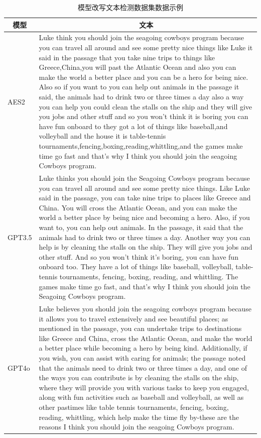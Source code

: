 \begin{table}[htbp]
\centering
\caption{模型改写文本检测数据集数据示例} \label{tab:TOSWT-eg}
\begin{tabular}{lp{12cm}}
\toprule
\multicolumn{1}{c}{\textbf{模型}} & \multicolumn{1}{c}{\textbf{文本}}  \\ \midrule
AES2 \cite{learning-agency-lab-automated-essay-scoring-2}                            & Luke think you should join the   seagoing cowboys program because you can travel all around and see some   pretty nice things like Luke it said in the passage that you take nine trips   to things like Greece,China,you will past the Atlantic Ocean and also you can   make the world a better place and you can be a hero for being nice. Also so if you want to you can help out animals in the passage it said, the   animals had to drink two or three times a day also a way you can help you   could clean the stalls on the ship and they will give you jobs and other   stuff and so you won't think it is boring you can have fun onboard to they   got a lot of things like baseball,and volleyball and the house it is   table-tennis tournaments,fencing,boxing,reading,whittling,and the games make   time go fast and that's why I think you should join the seagoing Cowboys   program. \\ \midrule
GPT3.5 \cite{chatgpt}                         & Luke thinks you should   join the Seagoing Cowboys program because you can travel all around and see   some pretty nice things. Like Luke said in the passage, you can take nine   trips to places like Greece and China. You will cross the Atlantic Ocean, and   you can make the world a better place by being nice and becoming a   hero. Also, if you want to, you can help out animals. In the passage, it said   that the animals had to drink two or three times a day. Another way you can   help is by cleaning the stalls on the ship. They will give you jobs and other   stuff. And so you won't think it's boring, you can have fun onboard too. They   have a lot of things like baseball, volleyball, table-tennis tournaments,   fencing, boxing, reading, and whittling. The games make time go fast, and   that's why I think you should join the Seagoing Cowboys program.   \\ \midrule
GPT4o \cite{gpt4o}                          & Luke believes you should join the seagoing   cowboys program because it allows you to travel extensively and see beautiful   places; as mentioned in the passage, you can undertake trips to destinations   like Greece and China, cross the Atlantic Ocean, and make the world a better   place while becoming a hero by being kind. Additionally, if you wish, you can assist with caring for animals; the   passage noted that the animals need to drink two or three times a day, and   one of the ways you can contribute is by cleaning the stalls on the ship,   where they will provide you with various tasks to keep you engaged, along   with fun activities such as baseball and volleyball, as well as other   pastimes like table tennis tournaments, fencing, boxing, reading, whittling,   which help make the time fly by-these are the reasons I think you should join   the seagoing Cowboys program. \\ \midrule

\end{tabular}
\end{table}
